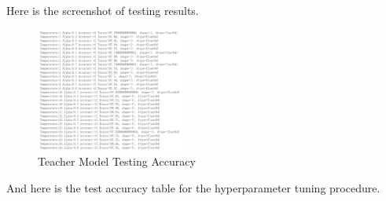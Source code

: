 \documentclass[conference]{IEEEtran}
\begin{document}
Here is the screenshot of testing results.
\begin{figure}[h] 
    \centering
    \includegraphics[width=0.45\textwidth]{./graphs/student_accuracy_mnist.png}
    \caption{Teacher Model Testing Accuracy}
    \label{Fig.t1q3e}
\end{figure}
And here is the test accuracy table for the hyperparameter tuning procedure.
\end{document}
